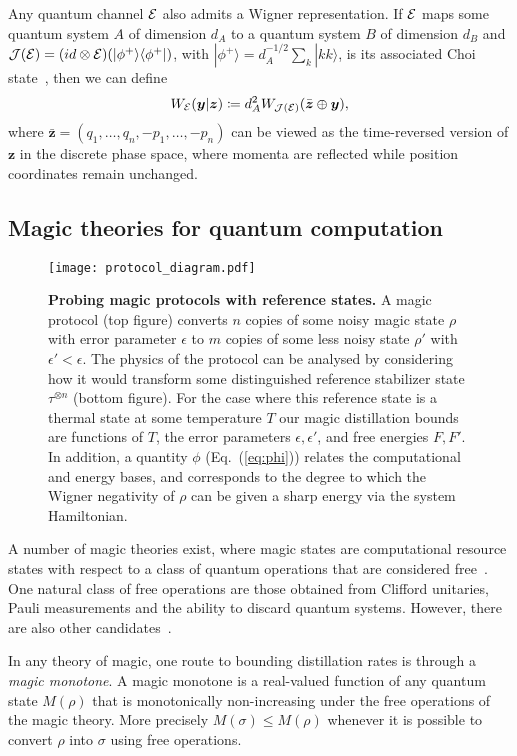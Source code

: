 \documentclass[
onecolumn,
superscriptaddress
]{revtex4-1}
\def\>{\rangle}
\def\<{\langle}
\def\y{\boldsymbol{y}}
\def\z{\boldsymbol{z}}
\def\E{{\cal E}}
\def\J{{\cal J}}
\begin{document}
Any quantum channel $\E$ also admits a Wigner representation. If $\E$ maps some quantum system $A$ of dimension $d_A$ to a quantum system $B$ of dimension $d_B$ and $\J(\E) = (id \otimes \E) (|\phi^+\> \<\phi^+|)$, with $|\phi^+\> = d_A^{-1/2} \sum_k |kk\>$, is its associated Choi state~\cite{watrous_2018}, then we can define
\begin{equation}\label{Wigner-Choi}
W_{\E}(\y |\z) \coloneqq d_A^2 W_{\J(\E)}(\bar{\z} \oplus \y),
\end{equation}
where $\bar{\z} = (q_1, \dots, q_n, -p_1, \dots, -p_n)$ can be viewed as the time-reversed version of $\z$ in the discrete phase space, where momenta are reflected while position coordinates remain unchanged. 

\subsection*{Magic theories for quantum computation}
\begin{figure}[t]
    \centering
        \texttt{[image: protocol\_diagram.pdf]}
    \caption{\textbf{Probing magic protocols with reference states.} 
	A magic protocol (top figure) converts $n$ copies of some noisy magic state $\rho$ with error parameter $\epsilon$ to $m$ copies of some less noisy state $\rho'$ with $\epsilon' < \epsilon$. The physics of the protocol can be analysed by considering how it would transform some distinguished reference stabilizer state $\tau^{\otimes n}$ (bottom figure). For the case where this reference state is a thermal state at some temperature $T$ our magic distillation bounds are functions of $T$, the error parameters $\epsilon, \epsilon'$, and free energies $F, F'$. In addition, a quantity $\phi$ (Eq.~(\ref{eq:phi})) relates the computational and energy bases, and corresponds to the degree to which the Wigner negativity of $\rho$ can be given a sharp energy via the system Hamiltonian.}
    \label{fig:sketch}
\end{figure}
A number of magic theories exist, where magic states are computational resource states with respect to a class of quantum operations that are considered free~\cite{Gour_2019}. One natural class of free operations are those obtained from Clifford unitaries, Pauli measurements and the ability to discard quantum systems. However, there are also other candidates~\cite{cit:ahmadi, cit:seddon, Wang_2019}.

In any theory of magic, one route to bounding distillation rates is through a \emph{magic monotone}. A magic monotone is a real-valued function of any quantum state $M(\rho)$ that is monotonically non-increasing under the free operations of the magic theory. More precisely $M(\sigma) \le M(\rho)$ whenever it is possible to convert $\rho$ into $\sigma$ using free operations.
\end{document}
